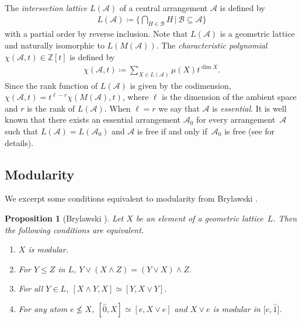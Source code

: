 \documentclass[11pt]{article}
\newtheorem{Proposition}[Theorem]{Proposition}
 { \theoremstyle{definition}
\newtheorem{Definition}[Theorem]{Definition}
\newtheorem{Example}[Theorem]{Example}
\newtheorem{Remark}[Theorem]{Remark}
\newtheorem{Question}[Theorem]{Question} }
\begin{document}
The \textit{intersection lattice} $ L(\mathcal{A}) $ of a central arrangement $ \mathcal{A} $ is defined by
\begin{gather*}
L(\mathcal{A}) \coloneqq \bigg\{ \bigcap_{H \in \mathcal{B}}H \,\bigg|\, \mathcal{B} \subseteq \mathcal{A} \bigg\}
\end{gather*}
with a partial order by reverse inclusion.
Note that $ L(\mathcal{A}) $ is a geometric lattice and naturally isomorphic to $ L(M(\mathcal{A})) $.
The \textit{characteristic polynomial} $ \chi(\mathcal{A}, t) \in \mathbb{Z}[t] $ is defined by
\begin{gather*}
\chi(\mathcal{A},t) \coloneqq \sum_{X \in L(\mathcal{A})}\mu(X)t^{\dim X}.
\end{gather*}
Since the rank function of $ L(\mathcal{A}) $ is given by the codimension, $ \chi(\mathcal{A},t) = t^{\ell-r}\chi(M(\mathcal{A}), t) $, where $ \ell $ is the dimension of the ambient space and $ r $ is the rank of $ L(\mathcal{A}) $.
When $ \ell = r $ we say that $ \mathcal{A} $ is \textit{essential}.
It is well known that there exists an essential arrangement $ \mathcal{A}_{0} $ for every arrangement~$ \mathcal{A} $ such that $ L(\mathcal{A}) = L(\mathcal{A}_{0}) $ and $ \mathcal{A} $ is free if and only if~$ \mathcal{A}_{0} $ is free (see \cite{orlik1992arrangements} for details).

\subsection{Modularity}

We excerpt some conditions equivalent to modularity from Brylawski \cite{brylawski1975modular-totams}.
\begin{Proposition}[Brylawski {\cite[Theorem~3.3]{brylawski1975modular-totams}}]\label{brylawski modular equivalent}
Let $ X $ be an element of a geometric lattice~$ L $.
Then the following conditions are equivalent.
\begin{enumerate}[$(1)$]\itemsep=0pt
\item $ X $ is modular.
\item\label{brylawski modular equivalent 2} For $ Y \leq Z $ in $ L $, $ Y \vee (X \wedge Z) = (Y \vee X) \wedge Z $.
\item\label{brylawski modular equivalent 3} For all $ Y \in L $, $ [X \wedge Y, X] \simeq [Y, X \vee Y] $.
\item\label{brylawski modular equivalent 4} For any atom $ e \not\leq X $, $ [\hat{0}, X] \simeq [e, X \vee e] $ and $ X \vee e $ is modular in $ \big[e, \hat{1}\big] $.
\end{enumerate}
\end{Proposition}
\end{document}
